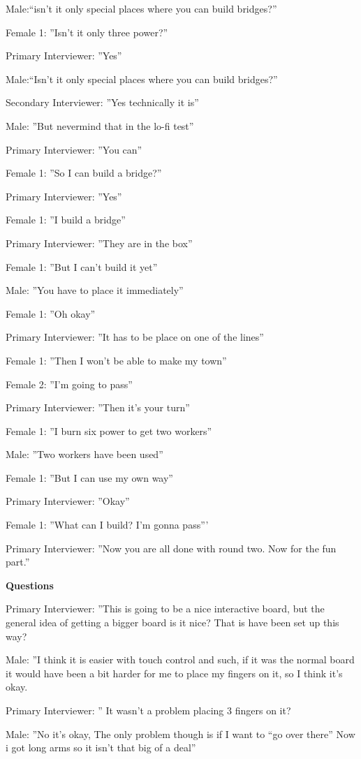 Male:“isn’t it only special places where you can build bridges?” 

Female 1: ”Isn’t it only three power?”

Primary Interviewer: ”Yes”

Male:“Isn’t it only special places where you can build bridges?” 

Secondary Interviewer: ”Yes technically it is”

Male: ”But nevermind that in the lo-fi test”

Primary Interviewer: ”You can”

Female 1: ”So I can build a bridge?”

Primary Interviewer: ”Yes”

Female 1: ”I build a bridge”

Primary Interviewer: ”They are in the box”

Female 1: ”But I can’t build it yet”

Male: ”You have to place it immediately”

Female 1: ”Oh okay”

Primary Interviewer: ”It has to be place on one of the lines”

Female 1: ”Then I won’t be able to make my town”

Female 2: ”I’m going to pass”

Primary Interviewer: ”Then it’s your turn”

Female 1: ”I burn six power to get two workers”

Male: ”Two workers have been used”

Female 1: ”But I can use my own way”

Primary Interviewer: ”Okay”

Female 1: ”What can I build? I’m gonna pass”’

Primary Interviewer: ”Now you are all done with round two. Now for the fun part.”

\textbf{Questions}

Primary Interviewer: ”This is going to be a nice interactive board, but the general idea of getting a bigger board is it nice? That is have been set up this way?

Male: ”I think it is easier with touch control and such, if it was the normal board it would have been a bit harder for me to place my fingers on it, so I think it’s okay. 

Primary Interviewer: ” It wasn’t a problem placing 3 fingers on it?

Male: ”No it’s okay, The only problem though is if I want to “go over there” Now i got long arms so it isn’t that big of a deal”

